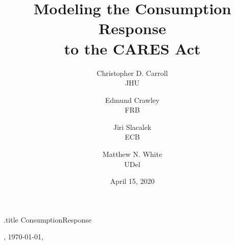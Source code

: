 \documentclass[titlepage]{\econtex}
\renewcommand{\forcedate}{April 15, 2020}
\begin{document}


\begin{verbatimwrite}{\jobname.title}
  ConsumptionResponse
\end{verbatimwrite}

\hfill{\tiny \jobname, \today, \currenttime}

\title{Modeling the Consumption Response\\ to the CARES Act}

{
  \author{
    Christopher D. Carroll\authNum \\ {\small JHU}
    \and
    Edmund Crawley\authNum   \\ {\small FRB}
    \and
    Jiri Slacalek\authNum    \\ {\small ECB}
    \and
    Matthew N. White\authNum \\ {\small UDel}
  }
} %



\date{\forcedate}
\maketitle
\end{document}
